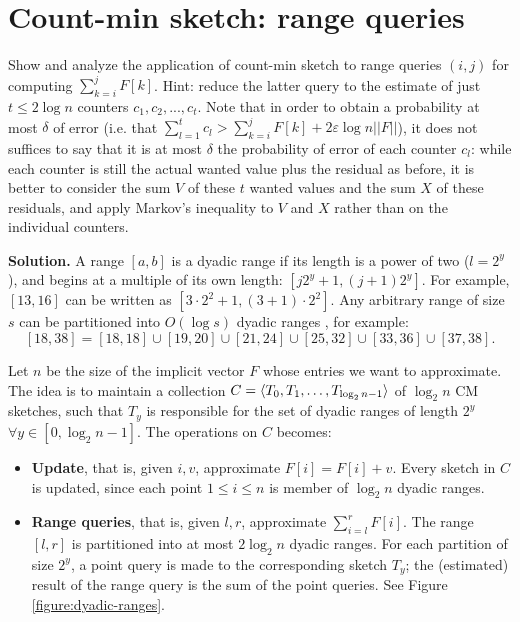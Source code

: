 \section{Count-min sketch: range queries}

Show and analyze the application of count-min sketch to range queries $(i,j)$ for computing  $\sum^j_{k=i} F[k]$. Hint: reduce the latter query to the estimate of just $t \leq 2 \log n$ counters $c_1,c_2,...,c_t$. Note that in order to obtain a probability at most $\delta$ of error (i.e. that $\sum^t_{l=1}c_l > \sum^j_{k=i}F[k] + 2\varepsilon \log n ||F||$), it does not suffices to say that it is at most $\delta$ the probability of error of each counter $c_l$: while each counter is still the actual wanted value plus the residual as before, it is better to consider the sum $V$ of these $t$ wanted values and the sum $X$ of these residuals, and apply Markov’s inequality to $V$ and $X$ rather than on the individual counters.

\vspace{1cm}
\noindent
\textbf{Solution.} A range $[a,b]$ is a dyadic range if its length is a power of two ($l=2^y$), and begins at a multiple of its own length: $[j2^y+1, (j+1)2^y]$. For example, $[13,16]$ can be written as $[3\cdot 2^2+1,(3+1)\cdot 2^2]$. Any arbitrary range of size $s$ can be partitioned into $O(\log s)$ dyadic ranges \cite{Cormode11}, for example:
$$[18,38]=[18,18]\cup[19,20]\cup[21,24]\cup[25,32]\cup[33,36]\cup[37,38].$$

Let $n$ be the size of the implicit vector $F$ whose entries we want to approximate. The idea is to maintain a collection $C=\langle T_0, T_1, \dots, T_{\log_2 n-1}\rangle$ of $\log_2 n$ CM sketches, such that $T_y$ is responsible for the set of dyadic ranges of length $2^y$ $\forall y\in [0, \log_2 n-1]$. The operations on $C$ becomes:
\begin{itemize}
  \item \textbf{Update}, that is, given $i,v$, approximate $F[i] = F[i] + v$. Every sketch in $C$ is updated, since each point $1 \leq i \leq n$ is member of $\log_2 n$ dyadic ranges.
  \item \textbf{Range queries}, that is, given $l, r$, approximate $\sum_{i=l}^rF[i]$. The range $[l,r]$ is partitioned into at most $2\log_2 n$ dyadic ranges. For each partition of size $2^y$, a point query is made to the corresponding sketch $T_y$; the (estimated) result of the range query is the sum of the point queries. See Figure \ref{figure:dyadic-ranges}.
\end{itemize}

